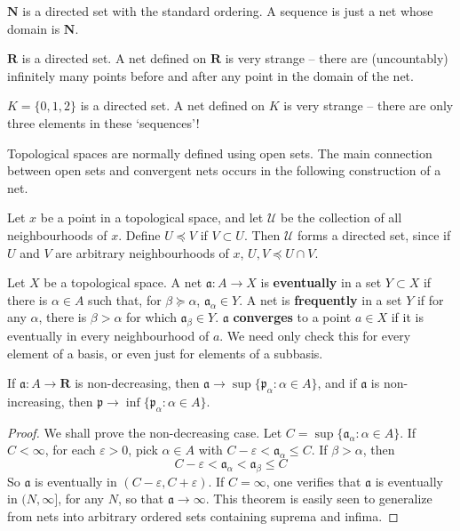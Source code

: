 \begin{example}
\begin{example}
    $\mathbf{N}$ is a directed set with the standard ordering. A sequence is just a net whose domain is $\mathbf{N}$.
\end{example}

\begin{example}
    $\mathbf{R}$ is a directed set. A net defined on $\mathbf{R}$ is very strange -- there are (uncountably) infinitely many points before and after any point in the domain of the net.
\end{example}

\begin{example}
    $K = \{ 0, 1, 2 \}$ is a directed set. A net defined on $K$ is very strange -- there are only three elements in these `sequences'!
\end{example}

Topological spaces are normally defined using open sets. The main connection between open sets and convergent nets occurs in the following construction of a net.

\begin{example}
    Let $x$ be a point in a topological space, and let $\mathcal{U}$ be the collection of all neighbourhoods of $x$. Define $U \preceq V$ if $V \subset U$. Then $\mathcal{U}$ forms a directed set, since if $U$ and $V$ are arbitrary neighbourhoods of $x$, $U, V \preceq U \cap V$.
\end{example}

Let $X$ be a topological space. A net $\mathfrak{a}: A \to X$ is {\bf eventually} in a set $Y \subset X$ if there is $\alpha \in A$ such that, for $\beta \succeq \alpha$, $\mathfrak{a}_\alpha \in Y$. A net is {\bf frequently} in a set $Y$ if for any $\alpha$, there is $\beta > \alpha$ for which $\mathfrak{a}_\beta \in Y$. $\mathfrak{a}$ {\bf converges} to a point $a \in X$  if it is eventually in every neighbourhood of $a$. We need only check this for every element of a basis, or even just for elements of a subbasis.

\begin{theorem}
    If $\mathfrak{a}: A \to \mathbf{R}$ is non-decreasing, then $\mathfrak{a} \to \sup \{ \mathfrak{p}_\alpha : \alpha \in A \}$, and if $\mathfrak{a}$ is non-increasing, then $\mathfrak{p} \to \inf \{ \mathfrak{p}_\alpha : \alpha \in A \}$.
\end{theorem}
\begin{proof}
    We shall prove the non-decreasing case. Let $ C = \sup \{ \mathfrak{a}_\alpha : \alpha \in A \}$. If $C < \infty$, for each $\varepsilon > 0$, pick $\alpha \in A$ with $C - \varepsilon < \mathfrak{a}_\alpha \leq C$. If $\beta > \alpha$, then
    \[ C - \varepsilon < \mathfrak{a}_\alpha < \mathfrak{a}_\beta \leq C \]
    So $\mathfrak{a}$ is eventually in $(C - \varepsilon, C + \varepsilon)$. If $C = \infty$, one verifies that $\mathfrak{a}$ is eventually in $(N,\infty]$, for any $N$, so that $\mathfrak{a} \to \infty$. This theorem is easily seen to generalize from nets into arbitrary ordered sets containing suprema and infima.
\end{proof}


\end{example}
